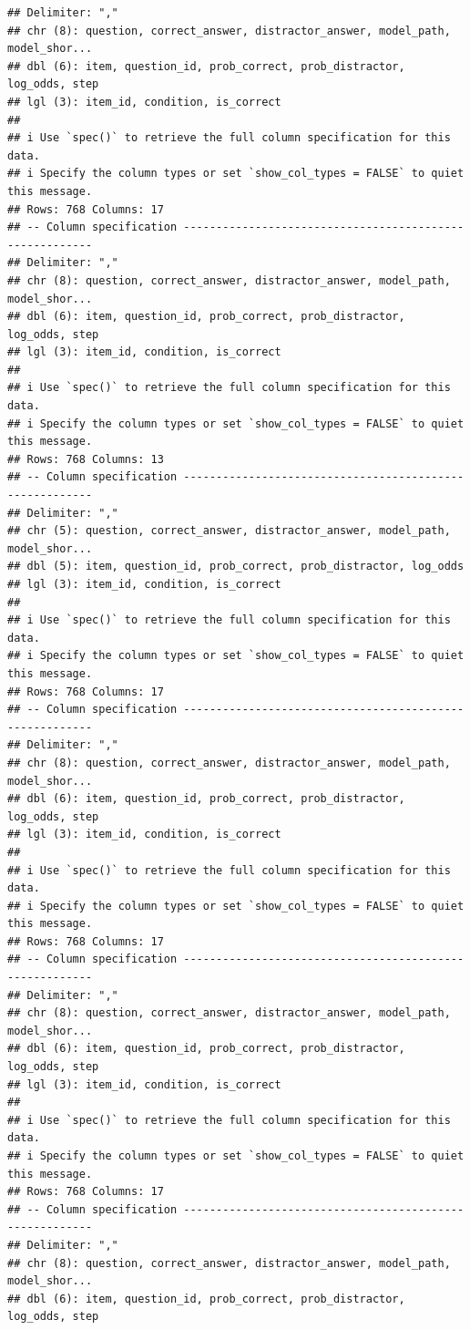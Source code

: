\documentclass[
]{article}
\begin{document}
\begin{verbatim}
## Delimiter: ","
## chr (8): question, correct_answer, distractor_answer, model_path, model_shor...
## dbl (6): item, question_id, prob_correct, prob_distractor, log_odds, step
## lgl (3): item_id, condition, is_correct
## 
## i Use `spec()` to retrieve the full column specification for this data.
## i Specify the column types or set `show_col_types = FALSE` to quiet this message.
## Rows: 768 Columns: 17
## -- Column specification --------------------------------------------------------
## Delimiter: ","
## chr (8): question, correct_answer, distractor_answer, model_path, model_shor...
## dbl (6): item, question_id, prob_correct, prob_distractor, log_odds, step
## lgl (3): item_id, condition, is_correct
## 
## i Use `spec()` to retrieve the full column specification for this data.
## i Specify the column types or set `show_col_types = FALSE` to quiet this message.
## Rows: 768 Columns: 13
## -- Column specification --------------------------------------------------------
## Delimiter: ","
## chr (5): question, correct_answer, distractor_answer, model_path, model_shor...
## dbl (5): item, question_id, prob_correct, prob_distractor, log_odds
## lgl (3): item_id, condition, is_correct
## 
## i Use `spec()` to retrieve the full column specification for this data.
## i Specify the column types or set `show_col_types = FALSE` to quiet this message.
## Rows: 768 Columns: 17
## -- Column specification --------------------------------------------------------
## Delimiter: ","
## chr (8): question, correct_answer, distractor_answer, model_path, model_shor...
## dbl (6): item, question_id, prob_correct, prob_distractor, log_odds, step
## lgl (3): item_id, condition, is_correct
## 
## i Use `spec()` to retrieve the full column specification for this data.
## i Specify the column types or set `show_col_types = FALSE` to quiet this message.
## Rows: 768 Columns: 17
## -- Column specification --------------------------------------------------------
## Delimiter: ","
## chr (8): question, correct_answer, distractor_answer, model_path, model_shor...
## dbl (6): item, question_id, prob_correct, prob_distractor, log_odds, step
## lgl (3): item_id, condition, is_correct
## 
## i Use `spec()` to retrieve the full column specification for this data.
## i Specify the column types or set `show_col_types = FALSE` to quiet this message.
## Rows: 768 Columns: 17
## -- Column specification --------------------------------------------------------
## Delimiter: ","
## chr (8): question, correct_answer, distractor_answer, model_path, model_shor...
## dbl (6): item, question_id, prob_correct, prob_distractor, log_odds, step

\end{verbatim}
\end{document}
